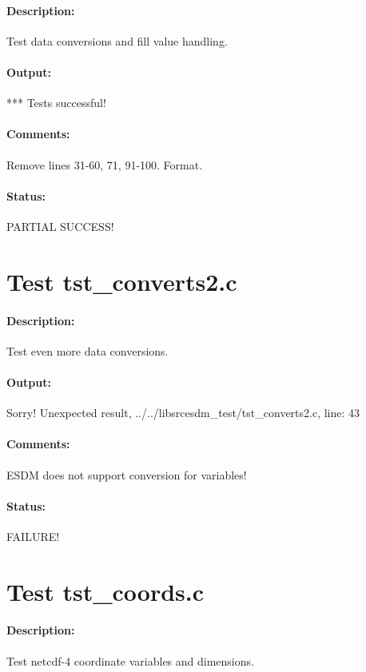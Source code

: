 \paragraph{Description:} Test data conversions and fill value handling.

\paragraph{Output:} *** Tests successful!

\paragraph{Comments:} Remove lines 31-60, 71, 91-100. Format.

\paragraph{Status:} PARTIAL SUCCESS!

\section{Test tst\_converts2.c}

\paragraph{Description:} Test even more data conversions.

\paragraph{Output:} Sorry! Unexpected result, ../../libsrcesdm\_test/tst\_converts2.c, line: 43

\paragraph{Comments:} ESDM does not support conversion for variables!

\paragraph{Status:} FAILURE!

\section{Test tst\_coords.c}

\paragraph{Description:} Test netcdf-4 coordinate variables and dimensions.

